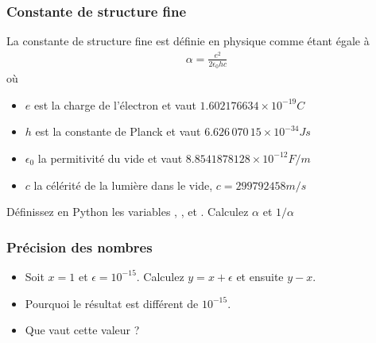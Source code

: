 \documentclass[letterpaper,10pt,english]{sphinxhowto}
\begin{document}
\subsubsection{Constante de structure fine}
\label{\detokenize{cours2_nombres_exercices:constante-de-structure-fine}}
\sphinxAtStartPar
La constante de structure fine est définie en physique comme étant égale à
\begin{equation*}
\begin{split} 
\alpha = \frac{e^2}{2\epsilon_0 h c}
\end{split}
\end{equation*}
\sphinxAtStartPar
où
\begin{itemize}
\item {} 
\sphinxAtStartPar
\(e\) est la charge de l’électron et vaut \(1.602176634 \times 10^{-19} C\)

\item {} 
\sphinxAtStartPar
\(h\) est la constante de Planck et vaut \(6.626\,070\,15 \times 10^{-34} J s\)

\item {} 
\sphinxAtStartPar
\(\epsilon_0\) la permitivité du vide et vaut \(8.8541878128 \times 10^{-12} F/m\)

\item {} 
\sphinxAtStartPar
\(c\) la célérité de la lumière dans le vide, \(c=299792458 m/s\)

\end{itemize}

\sphinxAtStartPar
Définissez en Python les variables , ,  et . Calculez \(\alpha\) et \(1/\alpha\)


\subsubsection{Précision des nombres}
\label{\detokenize{cours2_nombres_exercices:precision-des-nombres}}\begin{itemize}
\item {} 
\sphinxAtStartPar
Soit \(x=1\) et \(\epsilon = 10^{-15}\). Calculez \(y=x + \epsilon\) et ensuite \(y - x\).

\item {} 
\sphinxAtStartPar
Pourquoi le résultat est différent de \(10^{-15}\).

\item {} 
\sphinxAtStartPar
Que vaut cette valeur ?

\end{itemize}
\end{document}
